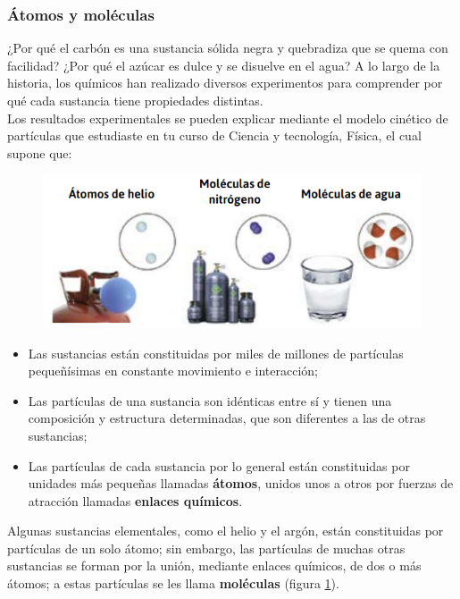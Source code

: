 \documentclass[11pt]{book}
\begin{document}
\subsubsection{\'Atomos y moléculas}

¿Por qué el carbón es una sustancia sólida negra y quebradiza que se quema con facilidad?
¿Por qué el azúcar es dulce y se disuelve en el agua? A lo largo de la historia, los químicos han realizado
diversos experimentos para comprender por qué cada sustancia tiene propiedades distintas.\\

Los resultados experimentales se pueden explicar mediante el modelo
cinético de partículas que estudiaste en tu curso de Ciencia y tecnología, Física, el cual supone que:

\begin{figure}[H]
  \centering
  \includegraphics[width=.6\linewidth]{atomos01.png}
  \label{fig:atomos01}
\end{figure}

\begin{itemize}
  \item[\checkmark] Las sustancias están constituidas por miles de millones de partículas pequeñísimas
        en constante movimiento e interacción;
  \item[\checkmark] Las partículas de una sustancia son idénticas entre sí y tienen una composición y
        estructura determinadas, que son diferentes a las de otras sustancias;
  \item[\checkmark] Las partículas de cada sustancia por lo general están constituidas por unidades más
        pequeñas llamadas \textbf{átomos}, unidos unos a otros por fuerzas de atracción llamadas \textbf{enlaces químicos}.
\end{itemize}

Algunas sustancias elementales, como el helio y el argón, están constituidas por partículas de un solo átomo; sin embargo, las
partículas de muchas otras sustancias se forman por la unión, mediante enlaces químicos, de dos o más átomos; a estas partículas
se les llama \textbf{moléculas} (figura \ref{fig:atomos01}).
\end{document}
